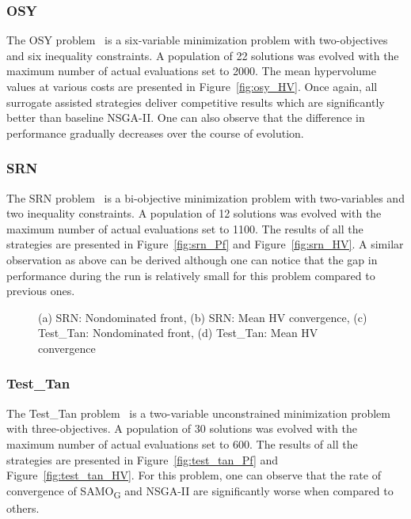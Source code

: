 \subsubsection{OSY} The OSY problem~\cite{osy1995mc} is a six-variable minimization problem with
two-objectives and six inequality constraints. A population of 22 solutions was evolved with the
maximum number of actual evaluations set to 2000. The mean hypervolume values at various costs are presented in
Figure~\ref{fig:osy_HV}. Once again, all surrogate assisted strategies deliver competitive results
which are significantly better than baseline NSGA-II. One can also observe that the difference in
performance gradually decreases over the course of evolution.

\subsubsection{SRN} The SRN problem~\cite{deb2002fae} is a bi-objective minimization problem with
two-variables and two inequality constraints. A population of 12 solutions was evolved with the
maximum number of actual evaluations set to 1100. The results of all the strategies are presented in
Figure~\ref{fig:srn_Pf} and Figure~\ref{fig:srn_HV}. A similar observation as above can be derived although one can notice
that the gap in performance during the run is relatively small for this problem compared to previous
ones.

\begin{figure*}[!htb] \centering
	\caption{(a) SRN: Nondominated front, (b) SRN: Mean HV convergence, (c) Test\_Tan: Nondominated front, (d) Test\_Tan: Mean HV convergence} 
	\label{fig:srntesttan_Pareto}
\end{figure*}

\subsubsection{Test\_Tan} The Test\_Tan problem~\cite{Tan2001ec} is a two-variable unconstrained
minimization problem with three-objectives. A population of 30 solutions was evolved with the
maximum number of actual evaluations set to 600. The results of all the strategies are presented in
Figure~\ref{fig:test_tan_Pf} and Figure~\ref{fig:test_tan_HV}. For this problem, one can observe that the rate of convergence of
SAMO\textsubscript{G} and NSGA-II are significantly worse when compared to others.

